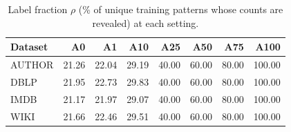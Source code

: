 \begin{table}[!t]
\centering\small
\setlength{\tabcolsep}{1.5pt}
\caption{Label fraction $\rho$ (\% of unique training patterns whose counts are revealed) at each setting.}
\label{tab:label-ledger}
\begin{tabular*}{\columnwidth}{@{\extracolsep{\fill}}lrrrrrrr@{}}
\toprule
Dataset & A0 & A1 & A10 & A25 & A50 & A75 & A100 \\
\midrule
AUTHOR & 21.26 & 22.04 & 29.19 & 40.00 & 60.00 & 80.00 & 100.00 \\
DBLP & 21.95 & 22.73 & 29.83 & 40.00 & 60.00 & 80.00 & 100.00 \\
IMDB & 21.17 & 21.97 & 29.07 & 40.00 & 60.00 & 80.00 & 100.00 \\
WIKI & 21.66 & 22.46 & 29.51 & 40.00 & 60.00 & 80.00 & 100.00 \\
\bottomrule
\end{tabular*}
\end{table}
